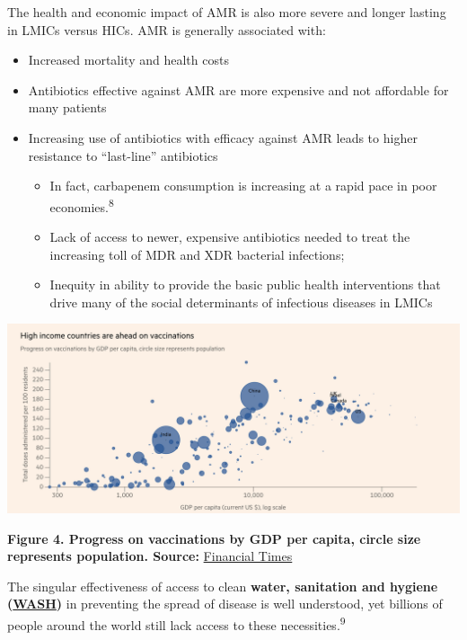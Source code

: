 \documentclass[
  11pt,
  paper=a4,
  ,captions=tableheading
]{scrartcl}
\begin{document}
The health and economic impact of AMR is also more severe and longer
lasting in LMICs versus HICs. AMR is generally associated with:

\begin{itemize}
\item
  Increased mortality and health costs
\item
  Antibiotics effective against AMR are more expensive and not
  affordable for many patients
\item
  Increasing use of antibiotics with efficacy against AMR leads to
  higher resistance to ``last-line'' antibiotics

  \begin{itemize}
  \item
    In fact, carbapenem consumption is increasing at a rapid pace in
    poor economies.\textsuperscript{8}
  \item
    Lack of access to newer, expensive antibiotics needed to treat the
    increasing toll of MDR and XDR bacterial infections;
  \item
    Inequity in ability to provide the basic public health interventions
    that drive many of the social determinants of infectious diseases in
    LMICs
  \end{itemize}
\end{itemize}

\includegraphics[width=6.25in,height=\textheight]{images/ft_vaccine differences.png}

\textbf{Figure 4. Progress on vaccinations by GDP per capita, circle
size represents population. Source:}
\href{https://www.ft.com/visual-and-data-journalism}{Financial Times}

The singular effectiveness of access to clean \textbf{water, sanitation
and hygiene
(\href{https://www.who.int/health-topics/water-sanitation-and-hygiene-wash}{WASH})}
in preventing the spread of disease is well understood, yet billions of
people around the world still lack access to these
necessities.\textsuperscript{9}
\end{document}
